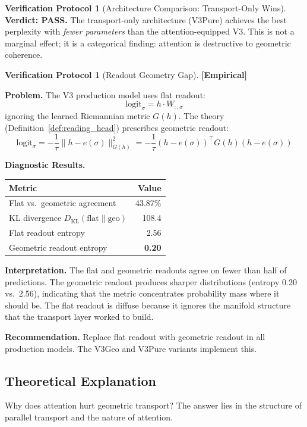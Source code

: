 \documentclass[11pt,a4paper]{article}
\theoremstyle{definition}
\newtheorem{protocol}[theorem]{Verification Protocol}
\theoremstyle{remark}
\newcommand{\statusempirical}{\textcolor{purple!70!black}{\textbf{[Empirical]}}}
\begin{document}
\begin{protocol}[Architecture Comparison: Transport-Only 
Wins]
\textbf{Verdict: PASS.} The transport-only architecture (V3Pure) 
achieves the best perplexity with \emph{fewer parameters} than 
the attention-equipped V3. This is not a marginal effect; it is 
a categorical finding: attention is destructive to geometric 
coherence.
\end{protocol}

\begin{protocol}[Readout Geometry Gap]\label{prot:readout_gap}
\statusempirical

\textbf{Problem.} The V3 production model uses flat readout:
\[
\text{logit}_\sigma = h \cdot W_{:,\sigma}
\]
ignoring the learned Riemannian metric $G(h)$. The theory 
(Definition~\ref{def:reading_head}) prescribes geometric readout:
\[
\text{logit}_\sigma = -\frac{1}{\tau}\|h - e(\sigma)\|^2_{G(h)} 
= -\frac{1}{\tau}(h - e(\sigma))^\top G(h) (h - e(\sigma))
\]

\textbf{Diagnostic Results.}
\begin{center}
\begin{tabular}{lr}
\toprule
Metric & Value \\
\midrule
Flat vs.\ geometric agreement & 43.87\% \\
KL divergence $D_{\text{KL}}(\text{flat} \| \text{geo})$ & 108.4 \\
Flat readout entropy & 2.56 \\
Geometric readout entropy & \textbf{0.20} \\
\bottomrule
\end{tabular}
\end{center}

\textbf{Interpretation.} The flat and geometric readouts agree 
on fewer than half of predictions. The geometric readout produces 
sharper distributions (entropy 0.20 vs.\ 2.56), indicating that 
the metric concentrates probability mass where it should be. The 
flat readout is diffuse because it ignores the manifold structure 
that the transport layer worked to build.

\textbf{Recommendation.} Replace flat readout with geometric 
readout in all production models. The V3Geo and V3Pure variants 
implement this.
\end{protocol}

\subsection{Theoretical Explanation}

Why does attention hurt geometric transport? The answer lies in 
the structure of parallel transport and the nature of attention.
\end{document}
